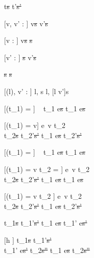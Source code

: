 




  {t\st{s}  t'\st{s'}}


[v, v' : \beta]
  { }
  {\Edit v\st{s}  \Edit v'\st{s}}


[v : \beta]
  { }
  {\Edit v\st{s} \handle{\Clear} \Fill \beta\st{s}}


[v' : \beta]
  { }
  {\Fill \beta\st{s}  \Edit v'\st{s}}


  { }
  {\Fail\st{s}  \Fail\st{s}}




[\Sigma(l), v' : \tau]
  { }
{\Change l, s  \Change l, [l \mapsto v']s}

[\Value(t_1) = \bot]
  {\ }
  {t_1 \ExThen e\st{s} \handle{\Next} t_1 \ExThen e\st{s}}

[\Value(t_1) = v]
  {e\ v \evaluate t_2    \\
   t_2\st{s} \normalise t_2'\st{s'} }
  {t_1 \ExThen e\st{s} \handle{\Next} t_2'\st{s'}}

[\Value(t_1) = \bot]
  {\ }
  {t_1 \Then e\st{s} \handle{\Execute \pi} t_1 \Then e\st{s}}

[\Value(t_1) = v \land t_2 = \Fail]
  {e\ v \evaluate t_2    \\
   t_2\st{s} \handle{\Pick \pi} t_2'\st{s'} }
  {t_1 \Then e\st{s} \handle{\Execute \pi} t_1 \Then e\st{s}}

[\Value(t_1) = v \land t_2 \neq \Fail]
  {e\ v \evaluate t_2    \\
   t_2\st{s} \handle{\Pick \pi} t_2'\st{s'} }
  {t_1 \Then e\st{s} \handle{\Execute \pi} t_2'\st{s'}}

  {t_1\st{s}  t_1'\st{s'}}
  {t_1 \ExThen e\st{s}  t_1' \ExThen e\st{s'}}

[h \neq \Execute \pi]
  {t_1\st{s}  t_1'\st{s'}       \\
   t_1' \Then e\st{s'} \normalise t_2\st{s''} }
  {t_1 \Then e\st{s}  t_2\st{s''}}

